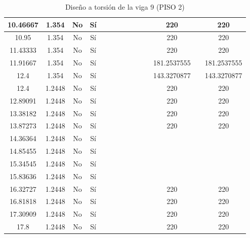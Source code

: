 \begin{table}[H]
{\begin{tabular}{|c|c|c|c|c|c|c|c|c|c|c|c|c|c|}
\hline
10.46667 & 1.354 & No  & Sí  &     &     &     &     &     &     &     & 220 &     & 220 \bigstrut\\
\hline
10.95 & 1.354 & No  & Sí  &     &     &     &     &     &     &     & 220 &     & 220 \bigstrut\\
\hline
11.43333 & 1.354 & No  & Sí  &     &     &     &     &     &     &     & 220 &     & 220 \bigstrut\\
\hline
11.91667 & 1.354 & No  & Sí  &     &     &     &     &     &     &     & 181.2537555 &     & 181.2537555 \bigstrut\\
\hline
12.4 & 1.354 & No  & Sí  &     &     &     &     &     &     &     & 143.3270877 &     & 143.3270877 \bigstrut\\
\hline
12.4 & 1.2448 & No  & Sí  &     &     &     &     &     &     &     & 220 &     & 220 \bigstrut\\
\hline
12.89091 & 1.2448 & No  & Sí  &     &     &     &     &     &     &     & 220 &     & 220 \bigstrut\\
\hline
13.38182 & 1.2448 & No  & Sí  &     &     &     &     &     &     &     & 220 &     & 220 \bigstrut\\
\hline
13.87273 & 1.2448 & No  & Sí  &     &     &     &     &     &     &     & 220 &     & 220 \bigstrut\\
\hline
14.36364 & 1.2448 & No  & Sí  &     &     &     &     &     &     &     &     &     &  \bigstrut\\
\hline
14.85455 & 1.2448 & No  & Sí  &     &     &     &     &     &     &     &     &     &  \bigstrut\\
\hline
15.34545 & 1.2448 & No  & Sí  &     &     &     &     &     &     &     &     &     &  \bigstrut\\
\hline
15.83636 & 1.2448 & No  & Sí  &     &     &     &     &     &     &     &     &     &  \bigstrut\\
\hline
16.32727 & 1.2448 & No  & Sí  &     &     &     &     &     &     &     & 220 &     & 220 \bigstrut\\
\hline
16.81818 & 1.2448 & No  & Sí  &     &     &     &     &     &     &     & 220 &     & 220 \bigstrut\\
\hline
17.30909 & 1.2448 & No  & Sí  &     &     &     &     &     &     &     & 220 &     & 220 \bigstrut\\
\hline
17.8 & 1.2448 & No  & Sí  &     &     &     &     &     &     &     & 220 &     & 220 \bigstrut\\
\hline
\end{tabular}%


%
  }
      \caption{Diseño a torsión de la viga 9 (PISO 2) }
  \label{tab:T VG9 P2 }%
\end{table}%
